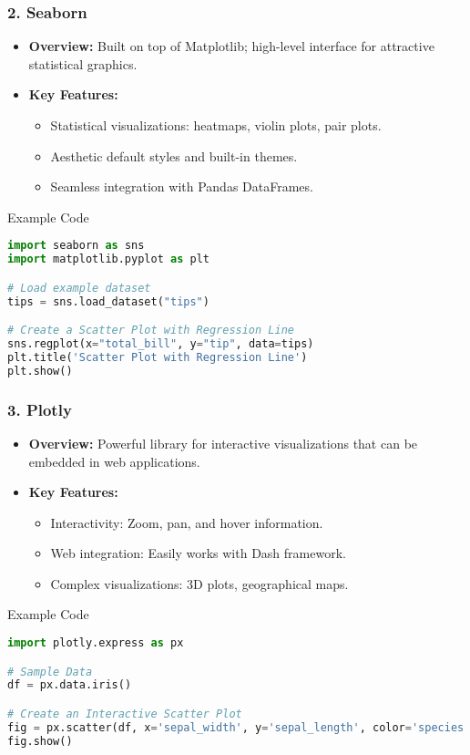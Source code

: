 \documentclass[aspectratio=169]{beamer}
\begin{document}
\begin{frame}
    \frametitle{2. Seaborn}
    \begin{itemize}
        \item \textbf{Overview:} Built on top of Matplotlib; high-level interface for attractive statistical graphics.
        \item \textbf{Key Features:}
            \begin{itemize}
                \item Statistical visualizations: heatmaps, violin plots, pair plots.
                \item Aesthetic default styles and built-in themes.
                \item Seamless integration with Pandas DataFrames.
            \end{itemize}
    \end{itemize}
    \begin{block}{Example Code}
    \begin{lstlisting}[language=Python]
import seaborn as sns
import matplotlib.pyplot as plt

# Load example dataset
tips = sns.load_dataset("tips")

# Create a Scatter Plot with Regression Line
sns.regplot(x="total_bill", y="tip", data=tips)
plt.title('Scatter Plot with Regression Line')
plt.show()
    \end{lstlisting}
    \end{block}
\end{frame}

\begin{frame}
    \frametitle{3. Plotly}
    \begin{itemize}
        \item \textbf{Overview:} Powerful library for interactive visualizations that can be embedded in web applications.
        \item \textbf{Key Features:}
            \begin{itemize}
                \item Interactivity: Zoom, pan, and hover information.
                \item Web integration: Easily works with Dash framework.
                \item Complex visualizations: 3D plots, geographical maps.
            \end{itemize}
    \end{itemize}
    \begin{block}{Example Code}
    \begin{lstlisting}[language=Python]
import plotly.express as px

# Sample Data
df = px.data.iris()

# Create an Interactive Scatter Plot
fig = px.scatter(df, x='sepal_width', y='sepal_length', color='species')
fig.show()
    \end{lstlisting}
    \end{block}
\end{frame}
\end{document}

